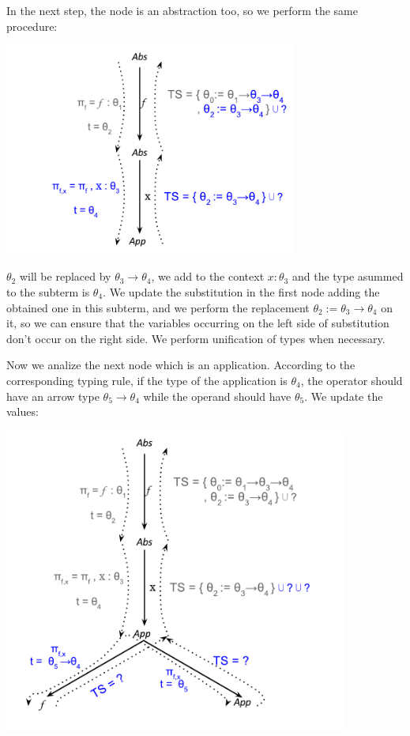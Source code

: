 \documentclass[a4paper,10pt]{article}
\begin{document}
  In the next step, the node is an abstraction too, so we perform the same procedure:
   
  \begin{center}
	\includegraphics[height=7cm]{segundo.pdf}
  \end{center}

  \noindent $\theta_2$ will be replaced by $\theta_3 \rightarrow \theta_4$, we add to the context $x:\theta_3$ and
  the type asummed to the subterm is $\theta_4$. We update the substitution in the first node adding the obtained
  one in this subterm, and we perform the replacement $\theta_2 := \theta_3 \rightarrow \theta_4$ on it, so
  we can ensure that the variables occurring on the left side of substitution don't occur on the right side. We
  perform unification of types when necessary.
  \medskip
  
  Now we analize the next node which is an application. According to the corresponding typing rule, if the type of
  the application is $\theta_4$,
  the operator should have an arrow type $\theta_5 \rightarrow \theta_4$ while the operand should have $\theta_5$.
  We update the values:
  
  \begin{center}
	\includegraphics[height=10cm]{tercero.pdf}
  \end{center}
  
\end{document}
